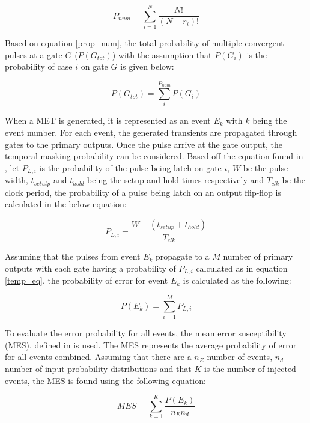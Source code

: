 \begin{equation} \label{prop_num}
P_{num} = \sum_{i=1}^{N} \frac{N!}{(N-r_i)!}
\end{equation} 

Based on equation \ref{prop_num}, the total probability of multiple convergent pulses at a gate $G$ ($P(G_{tot})$) with the assumption that $P(G_i)$ is the probability of case $i$ on gate $G$ is given below:

\begin{equation} \label{tot_gate}
P(G_{tot}) = \sum_{i}^{P_{num}} P(G_i)
\end{equation}

When a MET is generated, it is represented as an event $E_k$ with $k$ being the event number. For each event, the generated transients are propagated through gates to the primary outputs. Once the pulse arrive at the gate output, the temporal masking probability can be considered. Based off the equation found in \cite{Omana_Trap}, let  $P_{L,i}$ is the probability of the pulse being latch on gate $i$, $W$ be the pulse width, $t_{setutp}$ and $t_{hold}$ being the setup and hold times respectively and $T_{clk}$ be the clock period, the probability of a pulse being latch on an output flip-flop is calculated in the below equation:

\begin{equation} \label{temp_eq}
P_{L,i} = \frac{W - (t_{setup} + t_{hold})}{T_{clk}}
\end{equation}

Assuming that the pulses from event $E_k$ propagate to a $M$ number of primary outputs with each gate having a probability of $P_{L,i}$ calculated as in equation \ref{temp_eq}, the probability of error for event $E_k$ is calculated as the following:  

\begin{equation} \label{event_eq}
P(E_k) = \sum_{i=1}^{M} P_{L,i}
\end{equation}

To evaluate the error probability for all events, the mean error susceptibility (MES), defined in \cite{METSys} is used. The MES represents the average probability of error for all events combined. Assuming that there are a $n_E$ number of events, $n_d$ number of input probability distributions and that $K$ is the number of injected events, the MES is found using the following equation:

\begin{equation} \label{MES}
MES = \sum_{k=1}^{K} \frac{P(E_k)}{n_E n_d}
\end{equation}

